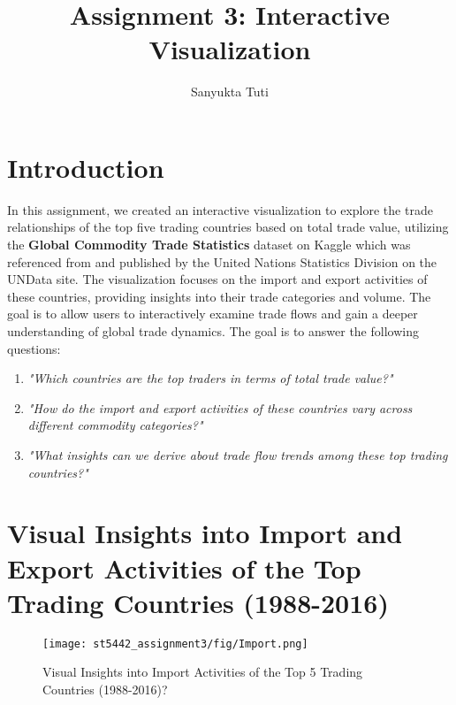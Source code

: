 \documentclass{article}
\title{Assignment 3: Interactive Visualization}
\author{Sanyukta Tuti}
\begin{document}
  \maketitle %
  \thispagestyle{empty}

\section{Introduction}
\label{sec:sec1}

\maketitle

In this assignment, we created an interactive visualization to explore the trade relationships of the top five trading countries based on total trade value, utilizing the \textbf{Global Commodity Trade Statistics}\cite{dataset} dataset on Kaggle which was referenced from and published by the United Nations Statistics Division on the UNData site. The visualization focuses on the import and export activities of these countries, providing insights into their trade categories and volume. The goal is to allow users to interactively examine trade flows and gain a deeper understanding of global trade dynamics. The goal is to answer the following questions:

\begin{enumerate}
    \item \textit{"Which countries are the top traders in terms of total trade value?"}
    \item \textit{"How do the import and export activities of these countries vary across different commodity categories?"}
    \item \textit{"What insights can we derive about trade flow trends among these top trading countries?"}
\end{enumerate}


\section{Visual Insights into Import and Export Activities of the Top Trading Countries (1988-2016)}

\begin{figure}[ht] 
    \centering
    \texttt{[image: st5442\_assignment3/fig/Import.png]}
    \caption{
        Visual Insights into Import Activities of the Top 5 Trading Countries (1988-2016)?
    }
    \label{fig:Import}
\end{figure}
\end{document}

